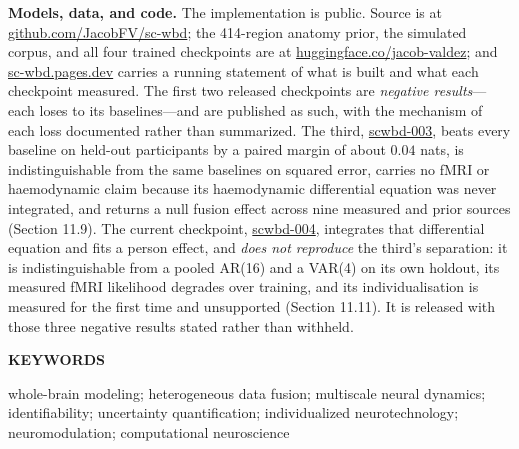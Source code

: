 \documentclass[10pt,a4paper]{article}
\begin{document}
{\vspace{2mm}
\noindent\textbf{Models, data, and code.} The implementation is public. Source is at \href{https://github.com/JacobFV/sc-wbd}{github.com/JacobFV/sc-wbd}; the 414-region anatomy prior, the simulated corpus, and all four trained checkpoints are at \href{https://huggingface.co/jacob-valdez}{huggingface.co/jacob-valdez}; and \href{https://sc-wbd.pages.dev}{sc-wbd.pages.dev} carries a running statement of what is built and what each checkpoint measured. The first two released checkpoints are \emph{negative results}---each loses to its baselines---and are published as such, with the mechanism of each loss documented rather than summarized. The third, \href{https://huggingface.co/jacob-valdez/scwbd-003}{scwbd-003}, beats every baseline on held-out participants by a paired margin of about \(0.04\) nats, is indistinguishable from the same baselines on squared error, carries no fMRI or haemodynamic claim because its haemodynamic differential equation was never integrated, and returns a null fusion effect across nine measured and prior sources (Section 11.9). The current checkpoint, \href{https://huggingface.co/jacob-valdez/scwbd-004}{scwbd-004}, integrates that differential equation and fits a person effect, and \emph{does not reproduce} the third's separation: it is indistinguishable from a pooled AR(16) and a VAR(4) on its own holdout, its measured fMRI likelihood degrades over training, and its individualisation is measured for the first time and unsupported (Section 11.11). It is released with those three negative results stated rather than withheld.

\vspace{4mm}
{\sffamily\bfseries\fontsize{7.4}{8.5}\selectfont\color{muted}KEYWORDS}\par
{\sffamily\fontsize{8.2}{10}\selectfont\color{muted}
whole-brain modeling; heterogeneous data fusion; multiscale neural dynamics; identifiability; uncertainty quantification; individualized neurotechnology; neuromodulation; computational neuroscience\par}

\clearpage
\twocolumn
\small





}
\end{document}
